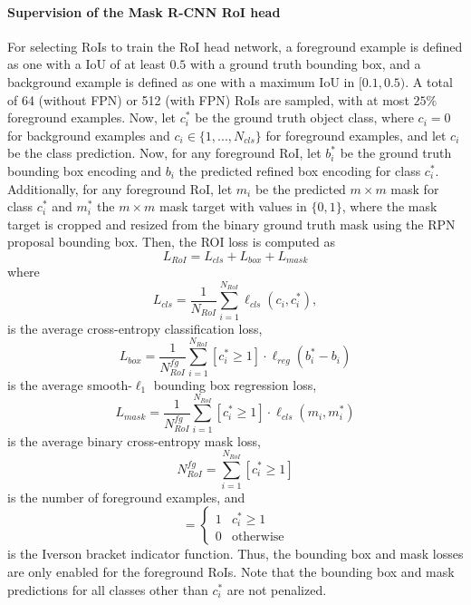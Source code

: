 \paragraph{Supervision of the Mask R-CNN RoI head}
For selecting RoIs to train the RoI head network, a foreground example
is defined as one with a IoU of at least $0.5$ with
a ground truth bounding box, and a background example is defined as
one with a maximum IoU in $[0.1, 0.5)$.
A total of 64 (without FPN) or 512 (with FPN) RoIs are sampled, with
at most $25\%$ foreground examples.
Now, let $c_i^*$ be the ground truth object class, where $c_i = 0$
for background examples and $c_i \in \{1, ..., N_{cls}\}$ for foreground examples,
and let $c_i$ be the class prediction.
Now, for any foreground RoI, let $b_i^*$ be the ground truth bounding box encoding and $b_i$
the predicted refined box encoding for class $c_i^*$.
Additionally, for any foreground RoI, let $m_i$ be the predicted $m \times m$ mask for class $c_i^*$
and $m_i^*$ the $m \times m$ mask target with values in $\{0,1\}$, where the mask target is cropped and resized from
the binary ground truth mask using the RPN proposal bounding box.
Then, the ROI loss is computed as
\begin{equation}
L_{RoI} = L_{cls} + L_{box} + L_{mask}
\end{equation}
where
\begin{equation}
L_{cls} = \frac{1}{N_{RoI}} \sum_{i=1}^{N_{RoI}} \ell_{cls}(c_i, c_i^*),
\end{equation}
is the average cross-entropy classification loss,
\begin{equation}
L_{box} = \frac{1}{N_{RoI}^{fg}} \sum_{i=1}^{N_{RoI}} [c_i^* \geq 1] \cdot \ell_{reg}(b_i^* - b_i)
\end{equation}
is the average smooth-$\ell_1$ bounding box regression loss,
\begin{equation}
L_{mask} = \frac{1}{N_{RoI}^{fg}} \sum_{i=1}^{N_{RoI}} [c_i^* \geq 1] \cdot \ell_{cls}(m_i,m_i^*)
\end{equation}
is the average binary cross-entropy mask loss,
\begin{equation}
N_{RoI}^{fg} = \sum_{i=1}^{N_{RoI}} [c_i^* \geq 1]
\end{equation}
is the number of foreground examples, and
\begin{equation}
[c_i^* \geq 1] =
\begin{cases}
1 &\text{$c_i^* \geq 1$} \\
0 &\text{otherwise}
\end{cases}
\end{equation}
is the Iverson bracket indicator function. Thus, the bounding box and mask
losses are only enabled for the foreground RoIs. Note that the bounding box and mask predictions
for all classes other than $c_i^*$ are not penalized.

